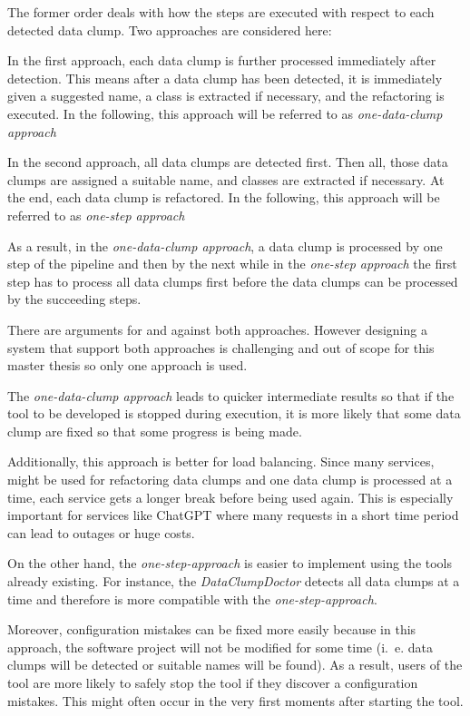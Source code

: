 The former order deals with how the steps are executed with respect to each detected data clump. Two approaches are considered here:

In the first approach, each data clump is   further processed immediately after detection. This means after a data clump has been detected, it is immediately given a suggested name, a class is extracted if necessary, and the refactoring is executed. In the following, this approach will be referred to as \textit{one-data-clump approach}

In the second approach, all data clumps are detected first. Then all, those data clumps are assigned a suitable name, and classes are extracted if necessary. At the end, each data clump is refactored. In the following, this approach will be referred to as \textit{one-step approach}

As a result, in the \textit{one-data-clump approach}, a data clump is processed by one step of the pipeline and then by the next while in the \textit{one-step approach} the first step has to process all data clumps first before the data clumps can be processed by the succeeding steps.

There are arguments for and against both approaches. However designing a system that support both approaches is challenging and out of scope for this master thesis so only one approach is used. 

The \textit{one-data-clump approach} leads to quicker intermediate results so that if the tool to be developed is stopped during execution, it is more likely that some data clump are fixed so that some progress is being made.

Additionally, this approach is better for load balancing. Since many services,  might be used for refactoring data clumps and one data clump is processed at a time, each service gets a longer break before being used again. This is  especially important for services like ChatGPT where many requests in a short time period can lead to outages or huge costs. 

On the other hand, the \textit{one-step-approach} is easier to implement using the tools already existing. For instance, the \textit{DataClumpDoctor} detects all data clumps at a time and therefore is more compatible with the \textit{one-step-approach}.

Moreover, configuration mistakes can be fixed more easily because in this approach, the software project will not be modified for some time (i.~e. data clumps will be detected or suitable names will be found). As a result, users of the tool are more likely to safely stop the tool if they discover a configuration mistakes. This might often occur in the very first moments after starting the tool.

